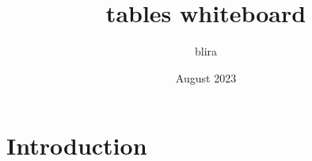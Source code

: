 \documentclass{article}
\title{tables whiteboard}
\author{blira }
\date{August 2023}
\begin{document}
\maketitle

\section{Introduction}


\end{document}
